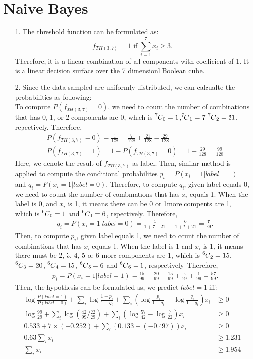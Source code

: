 \documentclass[11pt]{article}
\newcommand\Mycomb[2][n]{\prescript{#1\mkern-0.5mu}{}C_{#2}}
\begin{document}
\section{Naive Bayes}
\begin{itemize}
\item[1.] The threshold function can be formulated as:
\begin{equation*}
f_{TH(3,7)}=1 \textrm{ if } \sum_{i=1}^{7} x_i \geq 3.
\end{equation*}
Therefore, it is a linear combination of all components with coefficient of 1. It is a linear decision surface over the 7 dimensionl Boolean cube.

\item[2.] Since the data sampled are uniformly distributed, we can calcualte the probabilities as following: \\
To compute $P(f_{TH(3,7)}=0)$, we need to count the number of combinations that has 0, 1, or 2 components are 0, which is $\Mycomb[7]{0}=1$,$\Mycomb[7]{1}=7$,$\Mycomb[7]{2}=21$, repectively. Therefore,
\begin{align*}
& P(f_{TH(3,7)}=0)=\frac{1}{128}+\frac{7}{128}+\frac{21}{128}=\frac{29}{128} \\
& P(f_{TH(3,7)}=1)=1-P(f_{TH(3,7)}=0)=1-\frac{29}{128}=\frac{99}{128} 
\end{align*}
Here, we denote the result of $f_{TH(3,7)}$ as label. Then, similar method is applied to compute the conditional probabilites $p_i=P(x_i=1|label=1)$ and $ q_i=P(x_i=1|label=0)$. Therefore, to compute $q_i$, given label equals 0, we need to count the number of combinations that has $x_i$ equals 1. When the label is 0, and $x_i$ is 1, it means there can be 0 or 1more compents are 1, which is $\Mycomb[6]{0}=1$ and $\Mycomb[6]{1}=6$, repectively. Therefore,
\begin{align*}
& q_i =  P(x_i=1|label=0) = \frac{1}{1+7+21} + \frac{6}{1+7+21} = \frac{7}{29}.
\end{align*}
Then, to compute $p_i$, given label equals 1, we need to count the number of combinations that has $x_i$ equals 1. When the label is 1 and $x_i$ is 1, it means there must be 2, 3, 4, 5 or 6 more components are 1, which is $\Mycomb[6]{2}=15$, $\Mycomb[6]{3}=20$, $\Mycomb[6]{4}=15$, $\Mycomb[6]{5}=6$ and $\Mycomb[6]{6}=1$, respectively. Therefore,     
\begin{align*}
& p_i =  P(x_i=1|label=1) = \frac{15}{99} + \frac{20}{99}+\frac{15}{99}+\frac{6}{99}+\frac{1}{99} = \frac{57}{99}.
\end{align*}
Then, the hypothesis can be formulated as, we predict $label=1$ iff:
\begin{align*}
\log \frac{P(label=1)}{P(label=0)}+\sum_i \log \frac{1-p_i}{1-q_i}+\sum_i (\log \frac{p_i}{1-p_i}-\log \frac{q_i}{1-q_i})x_i & \geq 0 \\
\log \frac{99}{29}+\sum_i \log (\frac{42}{99}/\frac{22}{29})+\sum_i (\log \frac{57}{42}-\log \frac{7}{22})x_i & \geq 0 \\
0.533 + 7 \times  (-0.252) +\sum_i (0.133-(-0.497))x_i & \geq 0 \\
0.63 \sum_i x_i & \geq 1.231 \\
\sum_i x_i & \geq 1.954
\end{align*}


\end{itemize}
\end{document}
